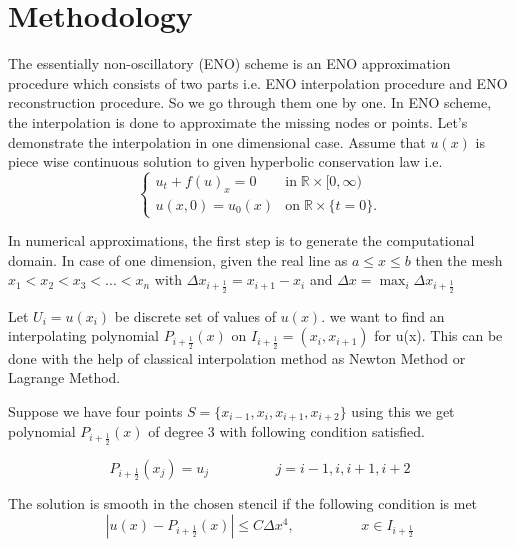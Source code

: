 \documentclass{article}
\begin{document}
\section{Methodology}
The essentially non-oscillatory (ENO) scheme is an ENO approximation procedure which consists of two parts i.e. ENO interpolation procedure  and ENO reconstruction procedure. So we go through them one by one. In ENO scheme, the interpolation is done to approximate the missing nodes or points. Let's demonstrate the interpolation in one dimensional case. Assume that $u(x)$ is piece wise continuous solution to given hyperbolic conservation law i.e.
\begin{equation}
  \begin{cases}
    u_{t} + f(u)_{x} = 0 &\text{in}\;\mathbb{R} \times [0,\infty)\\ 
    u(x,0) = u_{0}(x) &\text{on}\;\mathbb{R} \times \{t=0\}.
  \end{cases}
  \label{eq:conslaw}
\end{equation}

\noindent In numerical approximations, the first step is to generate the computational domain. In case of one dimension, given the real line as $a\leq x \leq b$ then the  mesh $x_1<x_2<x_3<...<x_n$ with $\Delta x_{i+\frac{1}{2}} = x_{i+1} - x_i$ and $\Delta x = \max_i{\Delta x_{i+\frac{1}{2}}}$

\noindent Let $U_i = u(x_i)$ be discrete set of values of $u(x)$. we want to find an interpolating polynomial $P_{i+\frac{1}{2}}(x)$ on $I_{i+\frac{1}{2}} = (x_i,x_{i+1})$ for u(x). This can be done with the help of classical interpolation method as Newton Method or Lagrange Method. 


\noindent Suppose we have four points $S = \{x_{i-1},x_i,x_{i+1},x_{i+2}\}$ using this we get polynomial $P_{i+\frac{1}{2}}(x)$ of degree 3 with following condition satisfied.

\begin{equation}
    P_{i+\frac{1}{2}}(x_j) = u_j \hspace{2cm} j=i-1,i,i+1,i+2
\end{equation}

\noindent The solution is smooth in the chosen stencil if the following condition is met
\begin{equation} \label{high_order_condition}
    |u(x) - P_{i + \frac{1}{2}}(x)| \leq C \Delta x ^4, \hspace{2cm} x \in I_{i + \frac{1}{2}}
\end{equation}
\end{document}
